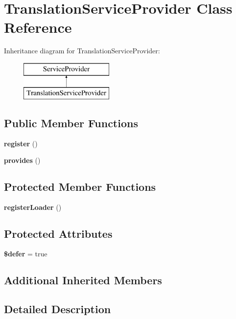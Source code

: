 \section{Translation\+Service\+Provider Class Reference}
\label{class_illuminate_1_1_translation_1_1_translation_service_provider}
Inheritance diagram for Translation\+Service\+Provider\+:\begin{figure}[H]
\begin{center}
\leavevmode
\includegraphics[height=2.000000cm]{class_illuminate_1_1_translation_1_1_translation_service_provider}
\end{center}
\end{figure}
\subsection*{Public Member Functions}
\begin{DoxyCompactItemize}
\item 
{\bf register} ()
\item 
{\bf provides} ()
\end{DoxyCompactItemize}
\subsection*{Protected Member Functions}
\begin{DoxyCompactItemize}
\item 
{\bf register\+Loader} ()
\end{DoxyCompactItemize}
\subsection*{Protected Attributes}
\begin{DoxyCompactItemize}
\item 
{\bf \$defer} = true
\end{DoxyCompactItemize}
\subsection*{Additional Inherited Members}


\subsection{Detailed Description}


